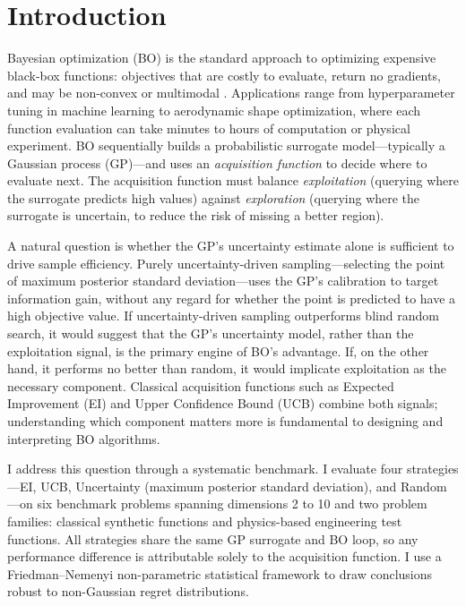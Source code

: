 \section{Introduction}
\label{sec:introduction}

Bayesian optimization (BO) is the standard approach to optimizing
expensive black-box functions: objectives that are costly to evaluate,
return no gradients, and may be non-convex or multimodal
\citep{frazier2018tutorial,shahriari2016taking}.
Applications range from hyperparameter tuning in machine learning to
aerodynamic shape optimization, where each function evaluation can take
minutes to hours of computation or physical experiment.
BO sequentially builds a probabilistic surrogate model—typically a
Gaussian process (GP)—and uses an \emph{acquisition function} to decide
where to evaluate next.
The acquisition function must balance \emph{exploitation} (querying
where the surrogate predicts high values) against \emph{exploration}
(querying where the surrogate is uncertain, to reduce the risk of
missing a better region).

A natural question is whether the GP's uncertainty estimate alone is
sufficient to drive sample efficiency.
Purely uncertainty-driven sampling—selecting the point of maximum
posterior standard deviation—uses the GP's calibration to target
information gain, without any regard for whether the point is predicted
to have a high objective value.
If uncertainty-driven sampling outperforms blind random search, it would
suggest that the GP's uncertainty model, rather than the exploitation
signal, is the primary engine of BO's advantage.
If, on the other hand, it performs no better than random, it would
implicate exploitation as the necessary component.
Classical acquisition functions such as Expected Improvement (EI) and
Upper Confidence Bound (UCB) combine both signals; understanding which
component matters more is fundamental to designing and interpreting BO
algorithms.

I address this question through a systematic benchmark.
I evaluate four strategies—EI, UCB, Uncertainty (maximum posterior
standard deviation), and Random—on six benchmark problems spanning
dimensions 2 to 10 and two problem families: classical synthetic
functions and physics-based engineering test functions.
All strategies share the same GP surrogate and BO loop, so any
performance difference is attributable solely to the acquisition
function.
I use a Friedman–Nemenyi non-parametric statistical framework
\citep{demsar2006statistical} to draw conclusions robust to
non-Gaussian regret distributions.


